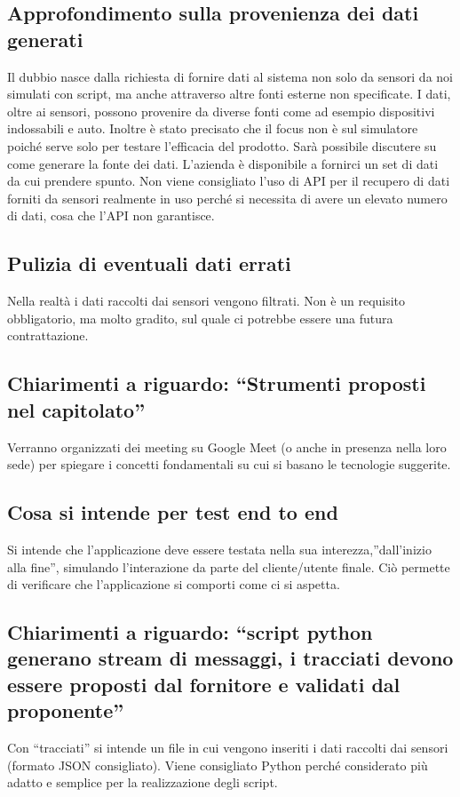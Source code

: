 \documentclass{article}
\begin{document}
    \subsection{Approfondimento sulla provenienza dei dati generati}
        Il dubbio nasce dalla richiesta di fornire dati al sistema non solo da sensori da noi simulati con script, ma anche attraverso altre fonti esterne non specificate.
        I dati, oltre ai sensori, possono provenire da diverse fonti come ad esempio dispositivi indossabili e auto. 
        Inoltre è stato precisato che il focus non è sul simulatore poiché serve solo per testare l’efficacia del prodotto.
        Sarà possibile discutere su come generare la fonte dei dati. L’azienda è disponibile a fornirci un set di dati da cui prendere spunto.
        Non viene consigliato l’uso di API per il recupero di dati forniti da sensori realmente in uso perché si necessita di avere un elevato numero di dati, cosa che l’API non garantisce. \subsection{Pulizia di eventuali dati errati} 
        Nella realtà i dati raccolti dai sensori vengono filtrati. Non è un requisito obbligatorio, ma molto gradito, sul quale ci potrebbe essere una futura contrattazione. \subsection{Chiarimenti a riguardo: “Strumenti proposti nel capitolato”} 
        Verranno organizzati dei meeting su Google Meet (o anche in presenza nella loro sede) per spiegare i concetti fondamentali su cui si basano le tecnologie suggerite. 
    
    \subsection{Cosa si intende per test end to end}
        Si intende che l’applicazione deve essere testata nella sua interezza,”dall’inizio alla fine”, simulando l’interazione da parte del cliente/utente finale. Ciò permette di verificare che l’applicazione si comporti come ci si aspetta. 

    \subsection{Chiarimenti a riguardo: “script python generano stream di messaggi, i tracciati devono essere proposti dal fornitore e validati dal proponente”}
        Con “tracciati” si intende un file in cui vengono inseriti i dati raccolti dai sensori (formato JSON consigliato). Viene consigliato Python perché considerato più adatto e semplice per la realizzazione degli script. 
    
\end{document}
